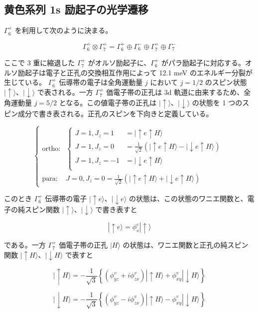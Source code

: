 \subsection{黄色系列 1s 励起子の光学遷移}

$\Gamma_6^+$ を利用して次のように決まる。

\[
\Gamma_6^+ \otimes \Gamma_7^+ = \Gamma_6^+ \oplus \Gamma_6^- \oplus \Gamma_7^+ \oplus \Gamma_7^-
\tag{2.1}
\]

ここで 3 重に縮退した $\Gamma_7^+$ がオルソ励起子に、$\Gamma_6^+$ がパラ励起子に対応する。オルソ励起子は電子と正孔の交換相互作用によって 12.1 meV のエネルギー分裂が生じている。
$\Gamma_6^+$ 伝導帯の電子は全角運動量 $j$ において $j = 1/2$ のスピン状態 $| \uparrow \rangle$、$| \downarrow \rangle$ で表される。一方 $\Gamma_7^+$ 価電子帯の正孔は 3d 軌道に由来するため、全角運動量 $j = 5/2$ となる。この値電子帯の正孔は $| \uparrow \rangle$、$| \downarrow \rangle$ の状態を 1 つのスピン成分で書き表される。正孔のスピンを下向きと定義している。

\[
\begin{cases}
\text{ortho:} & \begin{cases}
J = 1, J_z = 1 & = | \uparrow e \uparrow H \rangle \\
J = 1, J_z = 0 & = \frac{1}{\sqrt{2}} ( | \uparrow e \uparrow H \rangle - | \downarrow e \uparrow H \rangle ) \\
J = 1, J_z = -1 & = | \downarrow e \uparrow H \rangle \\
\end{cases} \\
\text{para:} & J = 0, J_z = 0 = \frac{1}{\sqrt{2}} ( | \uparrow e \uparrow H \rangle + | \downarrow e \uparrow H \rangle )
\end{cases}
\tag{2.2}
\]

このとき $\Gamma_6^+$ 伝導帯の電子 $| \uparrow e \rangle$、$| \downarrow e \rangle$ の状態は、この状態のワニエ関数と、電子の純スピン関数 $| \uparrow \rangle$、$| \downarrow \rangle$ で書き表すと

\[
| \uparrow e \rangle = \phi_s^c | \uparrow \rangle
\]

である。一方 $\Gamma_7^+$ 価電子帯の正孔 $| H \rangle$ の状態は、ワニエ関数と正孔の純スピン関数 $| \uparrow H \rangle$、$| \downarrow H \rangle$ で表すと

\[
| \uparrow H \rangle = - \frac{1}{\sqrt{3}} \left\{ ( \phi_{yz}^v + i \phi_{zx}^v ) | \uparrow H \rangle + \phi_{xy}^v | \downarrow H \rangle \right\}
\]

\[
| \downarrow H \rangle = - \frac{1}{\sqrt{3}} \left\{ ( \phi_{yz}^v - i \phi_{zx}^v ) | \uparrow H \rangle - \phi_{xy}^v | \downarrow H \rangle \right\}
\]
